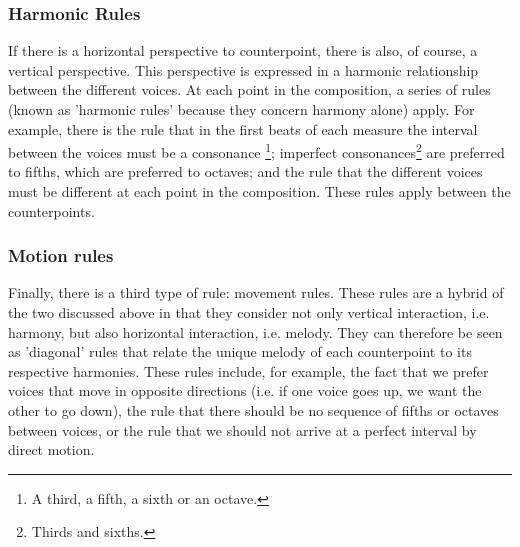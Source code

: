 \subsubsection{Harmonic Rules}


If there is a horizontal perspective to counterpoint, there is also, of course, a vertical perspective. This perspective is expressed in a harmonic relationship between the different voices. At each point in the composition, a series of rules (known as 'harmonic rules' because they concern harmony alone) apply. For example, there is the rule that in the first beats of each measure the interval between the voices must be a consonance \footnote{A third, a fifth, a sixth or an octave.}; imperfect consonances\footnote{Thirds and sixths.} are preferred to fifths, which are preferred to octaves; and the rule that the different voices must be different at each point in the composition. These rules apply between the counterpoints.

\subsubsection{Motion rules}
Finally, there is a third type of rule: movement rules. These rules are a hybrid of the two discussed above in that they consider not only vertical interaction, i.e. harmony, but also horizontal interaction, i.e. melody. They can therefore be seen as 'diagonal' rules that relate the unique melody of each counterpoint to its respective harmonies. These rules include, for example, the fact that we prefer voices that move in opposite directions (i.e. if one voice goes up, we want the other to go down), the rule that there should be no sequence of fifths or octaves between voices, or the rule that we should not arrive at a perfect interval by direct motion.

